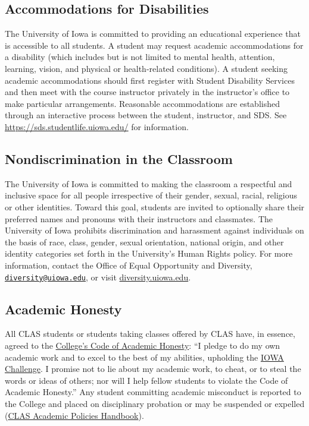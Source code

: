 \documentclass[11pt,]{article}
\theoremstyle{definition}
\theoremstyle{definition}
\theoremstyle{remark}
\begin{document}
\subsection{Accommodations for
Disabilities}\label{accommodations-for-disabilities}

The University of Iowa is committed to providing an educational
experience that is accessible to all students. A student may request
academic accommodations for a disability (which includes but is not
limited to mental health, attention, learning, vision, and physical or
health-related conditions). A student seeking academic accommodations
should first register with Student Disability Services and then meet
with the course instructor privately in the instructor's office to make
particular arrangements. Reasonable accommodations are established
through an interactive process between the student, instructor, and SDS.
See \url{https://sds.studentlife.uiowa.edu/} for information.

\subsection{Nondiscrimination in the
Classroom}\label{nondiscrimination-in-the-classroom}

The University of Iowa is committed to making the classroom a respectful
and inclusive space for all people irrespective of their gender, sexual,
racial, religious or other identities. Toward this goal, students are
invited to optionally share their preferred names and pronouns with
their instructors and classmates. The University of Iowa prohibits
discrimination and harassment against individuals on the basis of race,
class, gender, sexual orientation, national origin, and other identity
categories set forth in the University's Human Rights policy. For more
information, contact the Office of Equal Opportunity and Diversity,
\href{mailto:diversity@uiowa.edu}{\nolinkurl{diversity@uiowa.edu}}, or
visit
\href{https://diversity.uiowa.edu/office/equal-opportunity-and-diversity}{diversity.uiowa.edu}.

\subsection{Academic Honesty}\label{academic-honesty}

All CLAS students or students taking classes offered by CLAS have, in
essence, agreed to the
\href{https://clas.uiowa.edu/students/handbook/academic-fraud-honor-code}{College's
Code of Academic Honesty}: ``I pledge to do my own academic work and to
excel to the best of my abilities, upholding the
\href{https://newstudents.uiowa.edu/iowa-challenge}{IOWA Challenge}. I
promise not to lie about my academic work, to cheat, or to steal the
words or ideas of others; nor will I help fellow students to violate the
Code of Academic Honesty.'' Any student committing academic misconduct
is reported to the College and placed on disciplinary probation or may
be suspended or expelled
(\href{https://clas.uiowa.edu/students/handbook}{CLAS Academic Policies
Handbook}).
\end{document}
